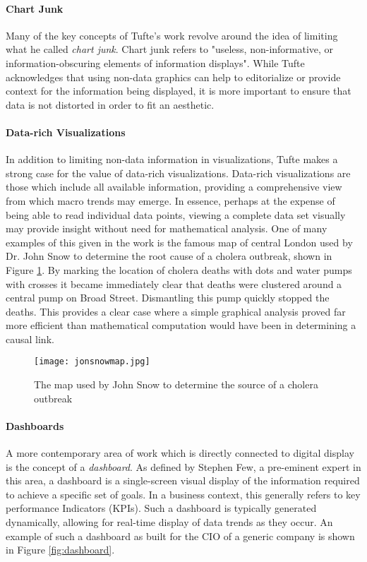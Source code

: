 \paragraph{Chart Junk}
Many of the key concepts of Tufte's work revolve around the idea of limiting what he called \emph{chart junk}. Chart junk refers to "useless, non-informative, or information-obscuring elements of information displays"\cite{Tufle1983}. While Tufte acknowledges that using non-data graphics can help to editorialize or provide context for the information being displayed,  it is more important to ensure that data is not distorted in order to fit an aesthetic. 

\paragraph{Data-rich Visualizations}
In addition to limiting non-data information in visualizations, Tufte makes a strong case for the value of data-rich visualizations. Data-rich visualizations are those which include all available information, providing a comprehensive view from which macro trends may emerge. In essence, perhaps at the expense of being able to read individual data points, viewing a complete data set visually may provide insight without need for mathematical analysis. One of many examples of this given in the work is the famous map of central London used by Dr. John Snow to determine the root cause of a cholera outbreak, shown in Figure \ref{fig:snowmap}. By marking the location of cholera deaths with dots and water pumps with crosses it became immediately clear that deaths were clustered around a central pump on Broad Street. Dismantling this pump quickly stopped the deaths. This provides a clear case where a simple graphical analysis proved far more efficient than mathematical computation would have been in determining a causal link.

\begin{figure}
	\centering
	\label{fig:snowmap}
	\texttt{[image: jonsnowmap.jpg]}
	\caption{The map used by John Snow to determine the source of a cholera outbreak \cite{Tufle1983}}
\end{figure}

\paragraph{Dashboards}
A more contemporary area of work which is directly connected to digital display is the concept of a \emph{dashboard}. As defined by Stephen Few, a pre-eminent expert in this area, a dashboard is a single-screen visual display of the information required to achieve a specific set of goals. In a business context, this generally refers to key performance Indicators (KPIs). Such a dashboard is typically generated dynamically, allowing for real-time display of data trends as they occur. An example of such a dashboard as built for the CIO of a generic company is shown in Figure \ref{fig:dashboard}. 

